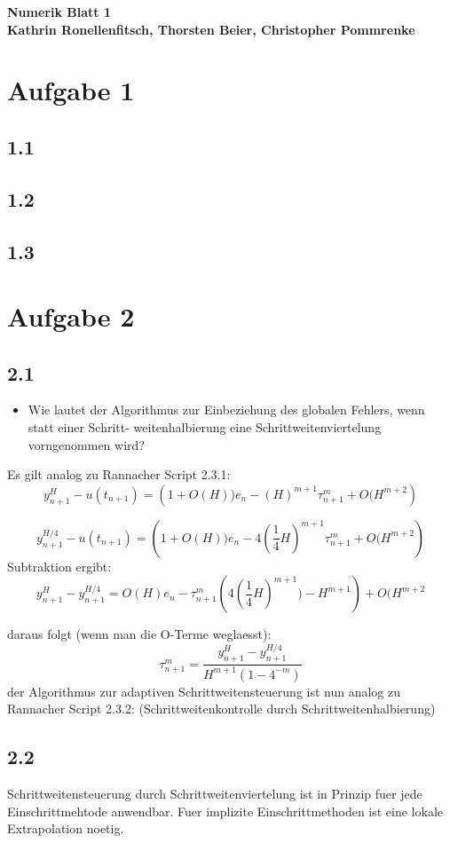 \documentclass[10pt,oneside,a4paper]{scrartcl}
\begin{document}
	\begin{center}
		\huge %
		\bfseries %
		\sffamily %
		Numerik Blatt 1\\[1em]
		\normalsize
		Kathrin Ronellenfitsch, Thorsten Beier, Christopher Pommrenke
	\end{center}

	
	\section*{Aufgabe 1}

    	\subsection*{1.1}


	\subsection*{1.2}


	\subsection*{1.3}
	
	\section*{Aufgabe 2}
	\subsection*{2.1}	
\begin{itemize}
\item Wie lautet der Algorithmus zur Einbeziehung des globalen Fehlers, wenn statt einer Schritt-
weitenhalbierung eine Schrittweitenviertelung vorngenommen wird?
\end{itemize}

Es gilt analog zu  Rannacher Script 2.3.1:
\[
y^{H}_{n+1}-u(t_{n+1})=
\left(1+O(H))e_n -(H)^{m+1}  \tau^{m}_{n+1} + O(H^{m+2}\right)
\]

\[
y^{H/4}_{n+1}-u(t_{n+1})=
\left(1+O(H))e_n -4(\frac{1}{4}H)^{m+1}  \tau^{m}_{n+1} +
O(H^{m+2}\right)
\]
Subtraktion ergibt:
\[
y^{H}_{n+1}-y^{H/4}_{n+1}=
O(H)e_n- \tau^{m}_{n+1}
\left(4(\frac{1}{4}H)^{m+1}) - H^{m+1} \right) +
O(H^{m+2}
\]

daraus folgt (wenn man die O-Terme weglaesst):
\[
\tau^{m}_{n+1}=
\frac{y^{H}_{n+1}-y^{H/4}_{n+1}}
{H^{m+1}(1-4^{-m})}
\]
der Algorithmus zur adaptiven Schrittweitensteuerung
ist nun analog zu Rannacher Script 2.3.2: (Schrittweitenkontrolle durch Schrittweitenhalbierung)

\subsection*{2.2}
Schrittweitensteuerung durch Schrittweitenviertelung ist in Prinzip fuer jede Einschrittmehtode anwendbar. Fuer implizite Einschrittmethoden ist eine lokale Extrapolation noetig.
\end{document}
